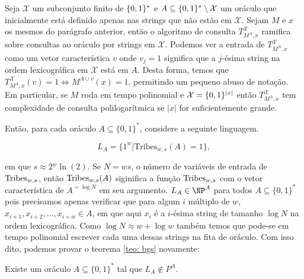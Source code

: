 Seja $\mathcal{X}$ um subconjunto finito de $\{0, 1\}^{*}$ e $A \subseteq \{0, 1\}^{*} \setminus \mathcal{X}$ um oráculo que inicialmente está definido apenas nas strings que não estão em $\mathcal{X}$. Sejam $M$ e $x$ os mesmos do parágrafo anterior, então o algoritmo de consulta $T_{M^{A}, x}^{\mathcal{X}}$ ramifica sobre consultas ao oráculo por strings em $\mathcal{X}$. Podemos ver a entrada de $T_{M^{A}, x}^{\mathcal{X}}$ como um vetor característica $v$ onde $v_{j} = 1$ significa que a $j$-ésima string na ordem lexicográfica em $\mathcal{X}$ está em $A$. Desta forma, temos que $T_{M^{A}, x}^{\mathcal{X}}(v) = 1 \iff M^{A \cup v}(x) = 1$, permitindo um pequeno abuso de notação. Em particular, se $M$ roda em tempo polinomial e $\mathcal{X} = \{0, 1\}^{\lvert x \rvert}$ então $T_{M^{A}, x}^{\mathcal{X}}$ tem complexidade de consulta polilogarítmica se $\lvert x \rvert$ for suficientemente grande.

Então, para cada oráculo $A \subseteq \{0, 1\}^{*}$, considere a seguinte linguagem.

\begin{equation*}
L_{A} = \{1^{w} \lvert \text{Tribes}_{w, s}(A) = 1\},
\end{equation*}

em que $s \approx 2{^w}\ln(2)$. Se $N = ws$, o número de variáveis de entrada de $\text{Tribes}_{w, s}$, então $\text{Tribes}_{w, s}(A)$ siginifica a função $\text{Tribes}_{w, s}$ com o vetor característica de $A^{= \log N}$ em seu argumento. $L_{A} \in \NP^{A}$ para todos $A \subseteq \{0, 1\}^{*}$ pois precisamos apenas verificar que para algum $i$ múltiplo de $w$, $x_{i + 1}, x_{i + 2}, \dots, x_{i + w} \in A$, em que aqui $x_{i}$ é a $i$-ésima string de tamanho $\log N$ na ordem lexicográfica. Como $\log N \approx w + \log w$ também temos que pode-se em tempo polinomial escrever cada uma dessas strings na fita de oráculo. Com isso dito, podemos provar o teorema \ref{teo: bgs} novamente:

\begin{prop} \label{prop: p_vs_np_r}

Existe um oráculo $A \subseteq \{0, 1\}^{*}$ tal que $L_{A} \notin P^{A}$.

\end{prop}

